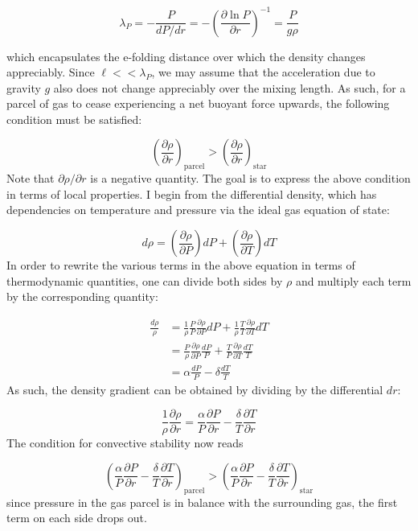 \documentclass[12pt]{article}
\newcommand{\pderiv}[2]{\frac{\partial #1}{\partial #2}}
\newcommand{\bigparenthesis}[1]{\left(#1\right)}
\begin{document}
\begin{equation}
    \lambda_P = - \frac{P}{dP/dr} = - \bigparenthesis{\pderiv{\ln P}{r}}^{-1} = \frac{P}{g\rho}
\end{equation}

which encapsulates the e-folding distance over which the density changes appreciably. Since $\ell << \lambda_P$, we may assume that the acceleration due to gravity $g$ also does not change appreciably over the mixing length. As such, for a parcel of gas to cease experiencing a net buoyant force upwards, the following condition must be satisfied:

\begin{equation}
    \bigparenthesis{\pderiv{\rho}{r}}_\mathrm{parcel} > \bigparenthesis{\pderiv{\rho}{r}}_\mathrm{star}
\end{equation}
%
Note that $\partial \rho / \partial r$ is a negative quantity. The goal is to express the above condition in terms of local properties. I begin from the differential density, which has dependencies on temperature and pressure via the ideal gas equation of state:

\begin{equation}
    d\rho = \bigparenthesis{\pderiv{\rho}{P}}dP + \bigparenthesis{\pderiv{\rho}{T}} dT
\end{equation}
%
In order to rewrite the various terms in the above equation in terms of thermodynamic quantities, one can divide both sides by $\rho$ and multiply each term by the corresponding quantity:

\begin{align}
    \frac{d\rho}{\rho} &= \frac{1}{\rho} \frac{P}{P}\pderiv{\rho}{P} dP + \frac{1}{\rho}\frac{T}{T} \pderiv{\rho}{T} dT \\
    &= \frac{P}{\rho} \pderiv{\rho}{P}\frac{dP}{P} + \frac{T}{P}\pderiv{\rho}{T}\frac{dT}{T} \\
    &= \alpha \frac{dP}{P} - \delta \frac{dT}{T}
\end{align}
%
As such, the density gradient can be obtained by dividing by the differential $dr$:

\begin{equation}
    \frac{1}{\rho} \pderiv{\rho}{r} = \frac{\alpha}{P} \pderiv{P}{r} - \frac{\delta}{T} \pderiv{T}{r}
\end{equation}
%
The condition for convective stability now reads

\begin{equation}
    \bigparenthesis{\frac{\alpha}{P} \pderiv{P}{r} - \frac{\delta}{T} \pderiv{T}{r}}_\mathrm{parcel} > \bigparenthesis{\frac{\alpha}{P} \pderiv{P}{r} - \frac{\delta}{T} \pderiv{T}{r}}_\mathrm{star}
\end{equation}
%
since pressure in the gas parcel is in balance with the surrounding gas, the first term on each side drops out.
\end{document}
